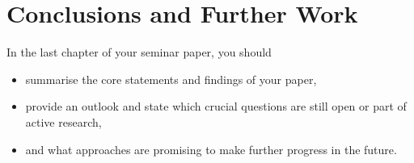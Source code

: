 \section{Conclusions and Further Work} 

In the last chapter of your seminar paper, you should
\begin{itemize}
    \item summarise the core statements and findings of your paper,
    \item provide an outlook and state which crucial questions are still open or part of active
        research,  
    \item and what approaches are promising to make further progress in the future.
\end{itemize}
